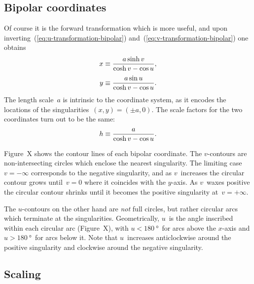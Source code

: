 \subsection{Bipolar coordinates}
\label{sec:bipolar.known.coordinates}

Of course it is the forward transformation which is more useful,
and upon inverting~(\ref{eq:u-transformation-bipolar})
and~(\ref{eq:v-transformation-bipolar})
one obtains
\begin{align}
  x &\ideq \frac{a \sinh v}{\cosh v - \cos u},
    \label{eq:x-transformation-bipolar}
    \\[\tallspace]
  y &\ideq \frac{a \sin u}{\cosh v - \cos u}.
    \label{eq:y-transformation-bipolar}
\end{align}
The length scale~$a$ is intrinsic to the coordinate system,
as it encodes the locations of the singularities~$(x, y) = (\pm a, 0)$.
The scale factors for the two coordinates turn out to be the same:
\begin{equation}
  \scalefac \ideq \frac{a}{\cosh v - \cos u}.
  \label{eq:scale-factor-bipolar}
\end{equation}

Figure~X shows the contour lines %
of each bipolar coordinate.
The $v$-contours are non-intersecting circles
which enclose the nearest singularity.
The limiting case~$v = -\infty$ corresponds to the negative singularity,
and as $v$~increases the circular contour grows until~$v = 0$
where it coincides with the $y$-axis.
As $v$~waxes positive the circular contour shrinks
until it becomes the positive singularity at~$v = +\infty$.

The $u$-contours on the other hand are \emph{not} full circles,
but rather circular arcs which terminate at the singularities.
Geometrically, $u$~is the angle inscribed within each circular arc
(Figure~X), %
with $u < \SI{180}{\degree}$~for arcs above the $x$-axis
and $u > \SI{180}{\degree}$~for arcs below it.
Note that $u$~increases anticlockwise around the positive singularity
and clockwise around the negative singularity.

\subsection{Scaling}
\label{sec:bipolar.known.scaling}

